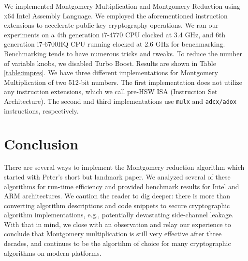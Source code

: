 \documentclass[twocolumn]{svjour3}          %
\begin{document}
We implemented Montgomery Multiplication and Montgomery Reduction using x64 Intel Assembly Language. We employed the aforementioned instruction extensions to accelerate public-key cryptography operations.
We ran our experiments on a 4th generation i7-4770 CPU clocked at 3.4 GHz, and 6th generation i7-6700HQ CPU running clocked at 2.6 GHz for benchmarking.
%
Benchmarking tends to have numerous tricks and tweaks. To reduce the number of variable knobs,
we disabled Turbo Boost. Results are shown in Table \ref{table:impres}. We have three different implementations for Montgomery Multiplication of two 512-bit numbers. The first implementation does not utilize any instruction extensions, which we call pre-HSW ISA (Instruction Set Architecture). The second and third implementations use \texttt{mulx} and \texttt{adcx/adox} instructions, respectively.


\section{Conclusion}
\label{sec:conc}
There are several ways to implement the Montgomery reduction algorithm
which started with Peter's short but landmark paper.
We analyzed several of these algorithms for run-time efficiency
and provided benchmark results for Intel and ARM architectures.
We caution the reader to dig deeper: there is more than converting algorithm
descriptions and code snippets to secure cryptographic algorithm implementations,
e.g., potentially devastating side-channel leakage.
With that in mind, we close with an observation and relay our experience to conclude
that Montgomery multiplication is still very effective after three decades,
and continues to be the algortihm of choice for many cryptographic algorithms on modern platforms.
\end{document}
